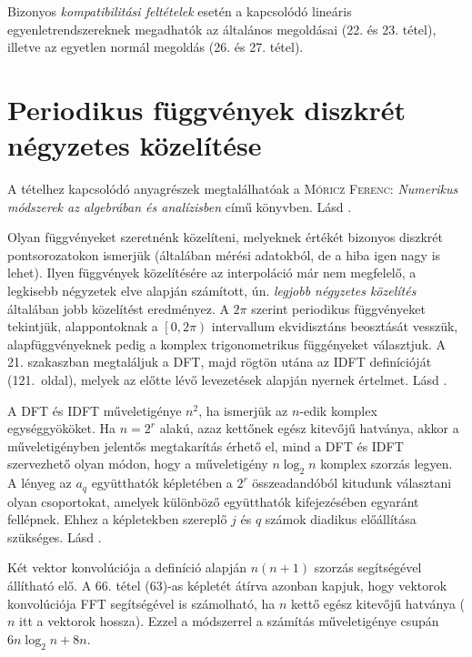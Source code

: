 \documentclass[%
	DIV=15,appendixprefix]{scrreprt}
\theoremstyle{definition}
\theoremstyle{remark}
\begin{document}
Bizonyos \emph{kompatibilitási feltételek} esetén a kapcsolódó lineáris egyenletrendszereknek
megadhatók az általános megoldásai (22. és 23. tétel), illetve az egyetlen normál megoldás (26. és 27. tétel).
%
\section{Periodikus függvények diszkrét négyzetes közelítése}
A tételhez kapcsolódó anyagrészek megtalálhatóak a \textsc{Móricz Ferenc}: \emph{Numerikus módszerek
az algebrában és analízisben} \cite[V. fejezet, 21. és 22. szakaszok]{Moricz1997} című könyvben.
%
Lásd \cite[V. fejezet, 21. szakasz]{Moricz1997}.

Olyan függvényeket szeretnénk közelíteni, melyeknek értékét bizonyos diszkrét pontsorozatokon
ismerjük (általában mérési adatokból, de a hiba igen nagy is lehet). Ilyen függvények közelítésére
az interpoláció már nem megfelelő, a legkisebb négyzetek elve alapján számított, ún. \emph{legjobb
négyzetes közelítés} általában jobb közelítést eredményez. A $ 2 \pi $ szerint periodikus
függvényeket tekintjük, alappontoknak a $ \left.\left[0,{} 2 \pi \right)\right. $ intervallum
ekvidisztáns beosztását vesszük, alapfüggvényeknek pedig a komplex trigonometrikus függényeket
választjuk. A 21. szakaszban megtaláljuk a DFT, majd rögtön utána az IDFT definícióját (121.~oldal),
melyek az előtte lévő levezetések alapján nyernek értelmet.
%
Lásd \cite[V. fejezet, 22. szakasz első fele]{Moricz1997}.

A DFT és IDFT műveletigénye $ n^{ 2 } $, ha ismerjük az $ n $-edik komplex egységgyököket. Ha
$ n = 2^{ r } $ alakú, azaz kettőnek egész kitevőjű hatványa, akkor a műveletigényben jelentős
megtakarítás érhető el, mind a DFT és IDFT szervezhető olyan módon, hogy a műveletigény $ n \log_2
n $ komplex szorzás legyen. A lényeg az $ a_{ q } $ együtthatók képletében a $ 2^{ r } $
összeadandóból kitudunk választani olyan csoportokat, amelyek különböző együtthatók kifejezésében
egyaránt fellépnek. Ehhez a képletekben szereplő $ j $ és $ q $ számok diadikus előállítása
szükséges.
%
Lásd \cite[V. fejezet, 22. szakasz második fele]{Moricz1997}.

Két vektor konvolúciója a definíció alapján $ n \left( n + 1 \right) $ szorzás segítségével
állítható elő. A 66. tétel (63)-as képletét átírva azonban kapjuk, hogy vektorok konvolúciója FFT
segítségével is számolható, ha $ n $ kettő egész kitevőjű hatványa ($ n $ itt a vektorok hossza).
Ezzel a módszerrel a számítás műveletigénye csupán $ 6 n \log_{ 2 } n + 8 n $.
%
\end{document}
